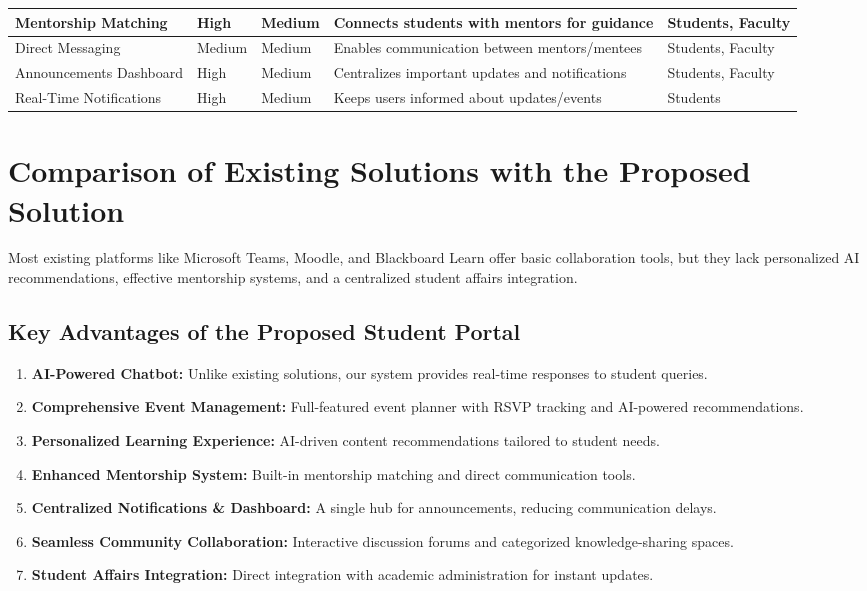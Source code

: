 \begin{longtable}{|L{4cm}|C{2.2cm}|C{2cm}|L{4cm}|L{3cm}|}
\hline
Mentorship Matching & High & Medium & Connects students with mentors for guidance & Students, Faculty \\
\hline
Direct Messaging & Medium & Medium & Enables communication between mentors/mentees & Students, Faculty \\
\hline
Announcements Dashboard & High & Medium & Centralizes important updates and notifications & Students, Faculty \\
\hline
Real-Time Notifications & High & Medium & Keeps users informed about updates/events & Students \\
\hline
\end{longtable}

\section{Comparison of Existing Solutions with the Proposed Solution}

Most existing platforms like Microsoft Teams, Moodle, and Blackboard Learn offer basic collaboration tools, but they lack personalized AI recommendations, effective mentorship systems, and a centralized student affairs integration.

\subsection*{Key Advantages of the Proposed Student Portal}

\begin{enumerate}
    \item \textbf{AI-Powered Chatbot:} Unlike existing solutions, our system provides real-time responses to student queries.
    \item \textbf{Comprehensive Event Management:} Full-featured event planner with RSVP tracking and AI-powered recommendations.
    \item \textbf{Personalized Learning Experience:} AI-driven content recommendations tailored to student needs.
    \item \textbf{Enhanced Mentorship System:} Built-in mentorship matching and direct communication tools.
    \item \textbf{Centralized Notifications \& Dashboard:} A single hub for announcements, reducing communication delays.
    \item \textbf{Seamless Community Collaboration:} Interactive discussion forums and categorized knowledge-sharing spaces.
    \item \textbf{Student Affairs Integration:} Direct integration with academic administration for instant updates.
\end{enumerate}
